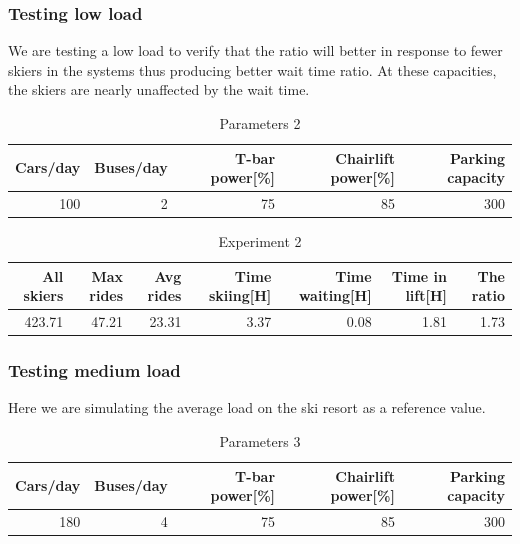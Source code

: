 \documentclass[11pt,a4paper]{article}
\begin{document}
\subsubsection{Testing low load}
We are testing a low load to verify that the ratio will better in response to fewer skiers in the systems thus producing better wait time ratio. At these capacities, the skiers are nearly unaffected by the wait time.
\begin{table}[H]
		\centering
		\begin{tabular}{|r|r|r|r|r|}
			\hline
			\textbf{Cars/day} &\textbf{Buses/day} & \textbf{T-bar power[\%]} 
				& \textbf{Chairlift power[\%]} & \textbf{Parking capacity} \\ \hline

			 100 & 2 & 75 & 85& 300\\ \hline
		\end{tabular}

		\caption{Parameters 2}
		\label{table:param2}
	\end{table}


\begin{table}[H]
    \centering
    \begin{tabular}{|r|r|r|r|r|r|r|}
        \hline
        \textbf{All skiers} &\textbf{Max rides} & \textbf{Avg rides} 
            & Time skiing[H] & Time waiting[H] & Time in lift[H]
            & \textbf{The ratio} \\ \hline

        423.71 & 47.21 & 23.31 & 3.37 & 0.08 & 1.81 & 1.73  \\ \hline
    \end{tabular}

    \caption{Experiment 2}
    \label{table:experiment2}
\end{table}

\subsubsection{Testing medium load}
Here we are simulating the average load on the ski resort as a reference value. 
\begin{table}[H]
    \centering
    \begin{tabular}{|r|r|r|r|r|}
        \hline
        \textbf{Cars/day} &\textbf{Buses/day} & \textbf{T-bar power[\%]} 
            & \textbf{Chairlift power[\%]} & \textbf{Parking capacity} \\ \hline

         180 & 4 & 75 & 85& 300\\ \hline
    \end{tabular}

    \caption{Parameters 3}
    \label{table:param3}
\end{table}
\end{document}
